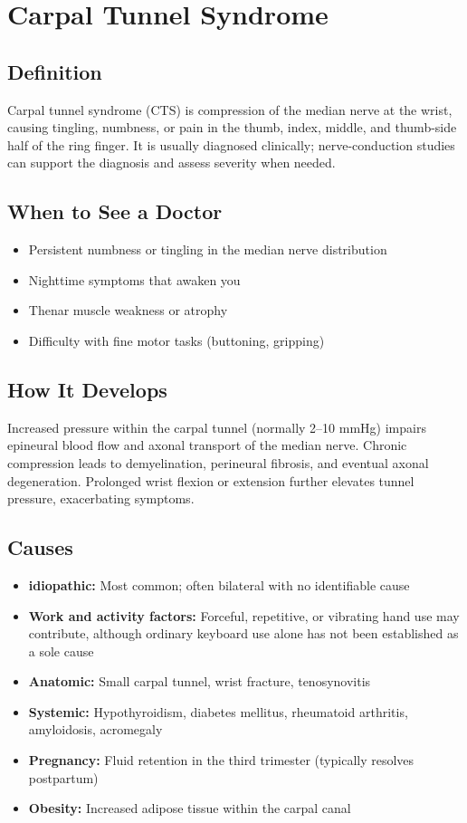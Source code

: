 \chapter{Carpal Tunnel Syndrome}

\section*{Definition}
Carpal tunnel syndrome (CTS) is compression of the median nerve at the wrist, causing tingling, numbness, or pain in the thumb, index, middle, and thumb-side half of the ring finger. It is usually diagnosed clinically; nerve-conduction studies can support the diagnosis and assess severity when needed.

\section*{When to See a Doctor}

\begin{itemize}
 \item Persistent numbness or tingling in the median nerve distribution
 \item Nighttime symptoms that awaken you
 \item Thenar muscle weakness or atrophy
 \item Difficulty with fine motor tasks (buttoning, gripping)
\end{itemize}

\section*{How It Develops}
Increased pressure within the carpal tunnel (normally 2--10 mmHg) impairs epineural blood flow and axonal transport of the median nerve. Chronic compression leads to demyelination, perineural fibrosis, and eventual axonal degeneration. Prolonged wrist flexion or extension further elevates tunnel pressure, exacerbating symptoms.

\section*{Causes}
\begin{itemize}
 \item \textbf{idiopathic:} Most common; often bilateral with no identifiable cause
 \item \textbf{Work and activity factors:} Forceful, repetitive, or vibrating hand use may contribute, although ordinary keyboard use alone has not been established as a sole cause
 \item \textbf{Anatomic:} Small carpal tunnel, wrist fracture, tenosynovitis
 \item \textbf{Systemic:} Hypothyroidism, diabetes mellitus, rheumatoid arthritis, amyloidosis, acromegaly
 \item \textbf{Pregnancy:} Fluid retention in the third trimester (typically resolves postpartum)
 \item \textbf{Obesity:} Increased adipose tissue within the carpal canal
\end{itemize}

